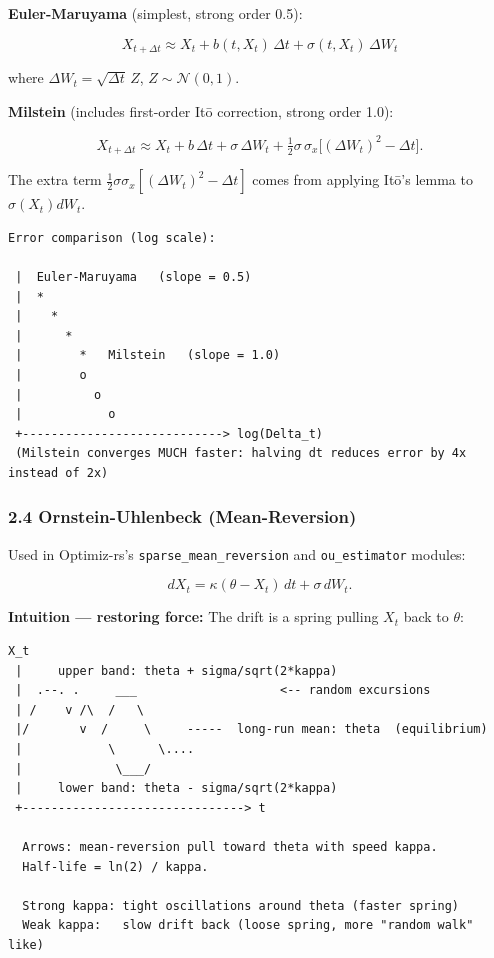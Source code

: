 \documentclass[11pt,a4paper]{article}
\begin{document}
\textbf{Euler-Maruyama} (simplest, strong order 0.5):

\[X_{t+\Delta t} \approx X_t + b(t,X_t)\,\Delta t + \sigma(t,X_t)\,\Delta W_t\]

where \(\Delta W_t = \sqrt{\Delta t}\,Z\), \(Z\sim\mathcal{N}(0,1)\).

\textbf{Milstein} (includes first-order Itō correction, strong order 1.0):

\[X_{t+\Delta t} \approx X_t + b\,\Delta t + \sigma\,\Delta W_t + \tfrac12\sigma\,\sigma_x\bigl[(\Delta W_t)^2 - \Delta t\bigr].\]

The extra term \(\tfrac12\sigma\sigma_x[(\Delta W_t)^2 - \Delta t]\) comes from applying Itō's lemma to \(\sigma(X_t)dW_t\).

\begin{verbatim}
Error comparison (log scale):

 |  Euler-Maruyama   (slope = 0.5)
 |  *
 |    *
 |      *
 |        *   Milstein   (slope = 1.0)
 |        o
 |          o
 |            o
 +----------------------------> log(Delta_t)
 (Milstein converges MUCH faster: halving dt reduces error by 4x instead of 2x)
\end{verbatim}

\subsubsection{2.4 Ornstein-Uhlenbeck (Mean-Reversion)}\label{ornstein-uhlenbeck-mean-reversion}

Used in Optimiz-rs's \texttt{sparse\_mean\_reversion} and \texttt{ou\_estimator} modules:

\[dX_t = \kappa(\theta - X_t)\,dt + \sigma\,dW_t.\]

\textbf{Intuition --- restoring force:} The drift is a spring pulling \(X_t\) back to \(\theta\):

\begin{verbatim}
X_t
 |     upper band: theta + sigma/sqrt(2*kappa)
 |  .--. .     ___                    <-- random excursions
 | /    v /\  /   \
 |/       v  /     \     -----  long-run mean: theta  (equilibrium)
 |            \      \....
 |             \___/
 |     lower band: theta - sigma/sqrt(2*kappa)
 +-------------------------------> t

  Arrows: mean-reversion pull toward theta with speed kappa.
  Half-life = ln(2) / kappa.
  
  Strong kappa: tight oscillations around theta (faster spring)
  Weak kappa:   slow drift back (loose spring, more "random walk" like)
\end{verbatim}
\end{document}
